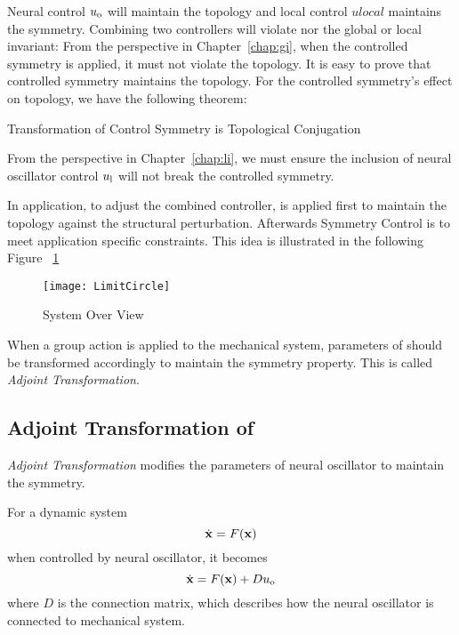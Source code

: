 Neural control $u_{\mathrm{o}}$ will maintain the topology and local control $ulocal$  maintains the symmetry.
Combining two controllers will violate nor the global or local invariant:
From the perspective in Chapter~\ref{chap:gi},
when the controlled symmetry  is applied, it must not violate the topology. 
It is easy to prove that controlled symmetry maintains the topology.
For the controlled symmetry's effect on topology, we have the following theorem:

\begin{mythe}
Transformation of Control Symmetry is Topological Conjugation
\end{mythe}


From the perspective in Chapter~\ref{chap:li},
we must ensure the inclusion of neural oscillator control $u_{\mathrm{l}}$ will not break the controlled symmetry.


In application, to adjust the combined controller,
\cpg is applied first to maintain the topology against the structural perturbation. 
Afterwards Symmetry Control is to meet application specific constraints.
This idea is illustrated in the following Figure ~\ref{fig:sysoverview}

\begin{figure}[!htbp]
  \begin{center}
      \texttt{[image: LimitCircle]}
    \caption{System Over View }
    \label{fig:sysoverview}
  \end{center}
\end{figure}

When a group action is applied to the mechanical system, parameters of \cpg should be transformed accordingly to maintain the symmetry property.
This is called \emph{Adjoint Transformation}.









\subsection{Adjoint Transformation of \cpg}
\emph{Adjoint Transformation} modifies the parameters of neural oscillator to maintain the symmetry.

For a dynamic system 
\[
\dot{\mathbf{x}}=F(\mathbf{x})
\]
when controlled by neural oscillator, it becomes 
\begin{equation}
\label{eq:gc}
\dot{\mathbf{x}}=F(\mathbf{x})+Du_{\mathrm{o}}
\end{equation}
where $D$ is the connection matrix, which describes how the neural oscillator is connected to mechanical system.


